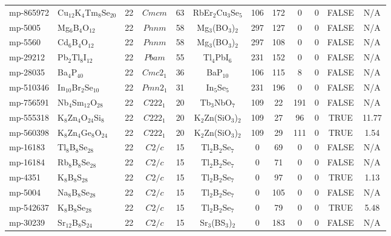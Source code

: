 {\begin{longtable}{llcccccccccc}
    mp-865972 & Cu$_{12}$K$_{4}$Tm$_{8}$Se$_{20}$ & 22    & $Cmcm$ & 63    & RbEr$_{2}$Cu$_{3}$Se$_{5}$ & 106   & 172   & 0     & 0     & FALSE & N/A \\
    mp-5005 & Mg$_{6}$B$_{4}$O$_{12}$ & 22    & $Pnnm$ & 58    & Mg$_{3}$(BO$_{3}$)$_{2}$ & 297   & 127   & 0     & 0     & FALSE & N/A \\
    mp-5560 & Cd$_{6}$B$_{4}$O$_{12}$ & 22    & $Pnnm$ & 58    & Mg$_{3}$(BO$_{3}$)$_{2}$ & 297   & 108   & 0     & 0     & FALSE & N/A \\
    mp-29212 & Pb$_{2}$Tl$_{8}$I$_{12}$ & 22    & $Pbam$ & 55    & Tl$_{4}$PbI$_{6}$ & 231   & 152   & 0     & 0     & FALSE & N/A \\
    mp-28035 & Ba$_{4}$P$_{40}$ & 22    & $Cmc2_1$ & 36    & BaP$_{10}$ & 106   & 115   & 8     & 0     & FALSE & N/A \\
    mp-510346 & In$_{10}$Br$_{2}$Se$_{10}$ & 22    & $Pmn2_1$ & 31    & In$_{5}$Se$_{5}$ & 231   & 196   & 0     & 0     & FALSE & N/A \\
    mp-756591 & Nb$_{4}$Sm$_{12}$O$_{28}$ & 22    & $C222_1$ & 20    & Tb$_{3}$NbO$_{7}$ & 109   & 22    & 191   & 0     & FALSE & N/A \\
    mp-555318 & K$_{8}$Zn$_{4}$O$_{24}$Si$_{8}$ & 22    & $C222_1$ & 20    & K$_{2}$Zn(SiO$_{3}$)$_{2}$ & 109   & 27    & 96    & 0     & TRUE  & 11.77  \\
    mp-560398 & K$_{8}$Zn$_{4}$Ge$_{8}$O$_{24}$ & 22    & $C222_1$ & 20    & K$_{2}$Zn(SiO$_{3}$)$_{2}$ & 109   & 29    & 111   & 0     & TRUE  & 1.54  \\
    mp-16183 & Tl$_{8}$B$_{8}$Se$_{28}$ & 22    & $C2/c$ & 15    & Tl$_{2}$B$_{2}$Se$_{7}$ & 0     & 69    & 0     & 0     & FALSE & N/A \\
    mp-16184 & Rb$_{8}$B$_{8}$Se$_{28}$ & 22    & $C2/c$ & 15    & Tl$_{2}$B$_{2}$Se$_{7}$ & 0     & 71    & 0     & 0     & FALSE & N/A \\
    mp-4351 & K$_{8}$B$_{8}$S$_{28}$ & 22    & $C2/c$ & 15    & Tl$_{2}$B$_{2}$Se$_{7}$ & 0     & 97    & 0     & 0     & TRUE  & 1.13  \\
    mp-5004 & Na$_{8}$B$_{8}$Se$_{28}$ & 22    & $C2/c$ & 15    & Tl$_{2}$B$_{2}$Se$_{7}$ & 0     & 105   & 0     & 0     & FALSE & N/A \\
    mp-542637 & K$_{8}$B$_{8}$Se$_{28}$ & 22    & $C2/c$ & 15    & Tl$_{2}$B$_{2}$Se$_{7}$ & 0     & 79    & 0     & 0     & TRUE  & 5.48  \\
    mp-30239 & Sr$_{12}$B$_{8}$S$_{24}$ & 22    & $C2/c$ & 15    & Sr$_{3}$(BS$_{3}$)$_{2}$ & 0     & 183   & 0     & 0     & FALSE & N/A \\

\end{longtable}}
